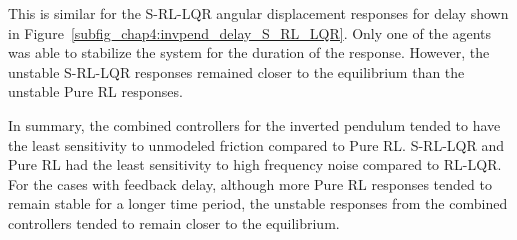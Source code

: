 %
This is similar for the S-RL-LQR angular displacement responses for delay shown in Figure~\ref{subfig_chap4:invpend_delay_S_RL_LQR}. Only one of the agents was able to stabilize the system for the duration of the response. However, the unstable S-RL-LQR responses remained closer to the equilibrium than the unstable Pure RL responses.
%

In summary, the combined controllers for the inverted pendulum tended to have the least sensitivity to unmodeled friction compared to Pure RL. S-RL-LQR and Pure RL had the least sensitivity to high frequency noise compared to RL-LQR. For the cases with feedback delay, although more Pure RL responses tended to remain stable for a longer time period, the unstable responses from the combined controllers tended to remain closer to the equilibrium.

